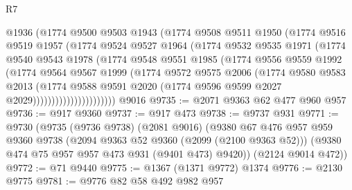 \begin{lexlean}{R7}
\begin{coremodule}
                      @1936
                      (@1774
                        @9500
                        @9503
                        @1943
                        (@1774
                          @9508
                          @9511
                          @1950
                          (@1774
                            @9516
                            @9519
                            @1957
                            (@1774
                              @9524
                              @9527
                              @1964
                              (@1774
                                @9532
                                @9535
                                @1971
                                (@1774
                                  @9540
                                  @9543
                                  @1978
                                  (@1774
                                    @9548
                                    @9551
                                    @1985
                                    (@1774
                                      @9556
                                      @9559
                                      @1992
                                      (@1774
                                        @9564
                                        @9567
                                        @1999
                                        (@1774
                                          @9572
                                          @9575
                                          @2006
                                          (@1774
                                            @9580
                                            @9583
                                            @2013
                                            (@1774
                                              @9588
                                              @9591
                                              @2020
                                              (@1774 @9596 @9599 @2027 @2029))))))))))))))))))))))
    @9016
@9735 := @2071 @9363 @62 @477 @960 @957
@9736 := @917 @9360
@9737 := @917 @473
@9738 := @9737 @931
@9771 := @9730
    (@9735
      (@9736 @9738)
      (@2081 @9016)
      (@9380
        @67
        @476
        @957
        @959
        @9360
        @9738
        (@2094 @9363 @52 @9360 (@2099 (@2100 @9363 @52)))
        (@9380 @474 @75 @957 @957 @473 @931 (@9401 @473) @9420))
      (@2124 @9014 @472))
@9772 := @71 @9440
@9775 := @1367 (@1371 @9772) @1374
@9776 := @2130 @9775
@9781 := @9776 @82 @58 @492 @982 @957

\end{coremodule}
\end{lexlean}
